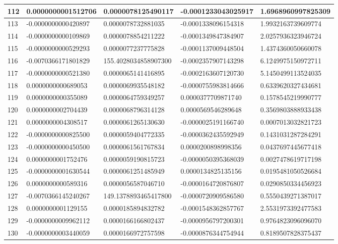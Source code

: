 \begin{center}
\begin{longtable}{|p{0.5cm}|p{3.5cm}|p{3.5cm}|p{3.5cm}|p{3.5cm}|}
\hline
112  & 0.0000000001512706  & 0.0000078125490117  & -0.0001233043025917  & 1.6968960997825309\\
\hline
113  & -0.0000000000420897  & 0.0000078732881035  & -0.0001338096154318  & 1.9932163739609774\\
\hline
114  & -0.0000000000109869  & 0.0000078854211222  & -0.0001349847384907  & 2.0257936323946724\\
\hline
115  & -0.0000000000529293  & 0.0000077237775828  & -0.0001137009448504  & 1.4374360050660078\\
\hline
116  & -0.0070366171801829  & 155.4028034858907300  & -0.0002357907143298  & 6.1249975150972711\\
\hline
117  & -0.0000000000521380  & 0.0000065141416895  & -0.0002163607120730  & 5.1450499113524035\\
\hline
118  & 0.0000000000689053  & 0.0000069935548182  & -0.0000755983814666  & 0.6339620327434681\\
\hline
119  & 0.0000000000355089  & 0.0000064759349257  & 0.0000377709871740  & 0.1578545219990777\\
\hline
120  & 0.0000000002704439  & 0.0000068796314128  & 0.0000569546289648  & 0.3569803888933438\\
\hline
121  & 0.0000000004308517  & 0.0000061265130630  & -0.0000025191166740  & 0.0007013032821723\\
\hline
122  & -0.0000000000825500  & 0.0000059404772335  & -0.0000362435592949  & 0.1431031287284291\\
\hline
123  & -0.0000000000450500  & 0.0000061561767834  & 0.0000200898998356  & 0.0437697445677418\\
\hline
124  & 0.0000000001752476  & 0.0000059190815723  & -0.0000050395368039  & 0.0027478619717198\\
\hline
125  & -0.0000000001630544  & 0.0000061251485949  & 0.0000134825135156  & 0.0195481050526684\\
\hline
126  & 0.0000000000589316  & 0.0000056587046710  & -0.0000164720876807  & 0.0290850334456923\\
\hline
127  & -0.0070366145240267  & 149.1378893465417800  & -0.0000720909586580  & 0.5550439271387017\\
\hline
128  & 0.0000000001129155  & 0.0000185894832782  & -0.0001548362857767  & 2.5531973392477583\\
\hline
129  & -0.0000000009962112  & 0.0000166166802437  & -0.0000956797200301  & 0.9764823096096070\\
\hline
130  & -0.0000000003440059  & 0.0000166972757598  & -0.0000876344754944  & 0.8189507828375437\\

\end{longtable}
\end{center}
